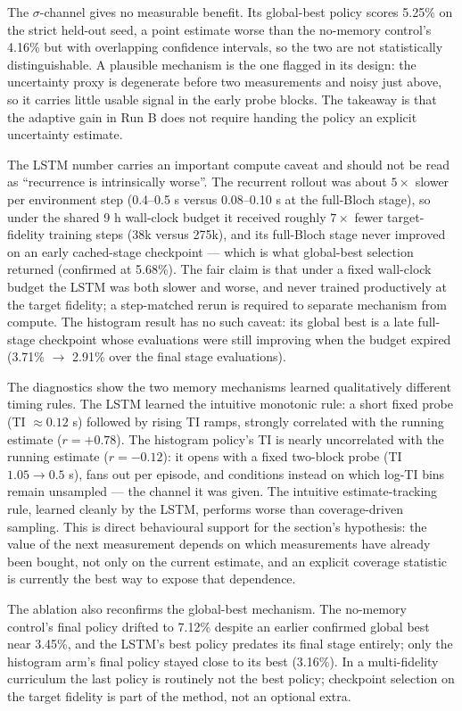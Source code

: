 The $\sigma$-channel gives no measurable benefit. Its global-best policy
scores 5.25\% on the strict held-out seed, a point estimate worse than the
no-memory control's 4.16\% but with overlapping confidence intervals, so the
two are not statistically distinguishable. A plausible mechanism is the one
flagged in its design: the uncertainty proxy is degenerate before two
measurements and noisy just above, so it carries little usable signal in the
early probe blocks. The takeaway is that the adaptive gain in Run B does not
require handing the policy an explicit uncertainty estimate.

The LSTM number carries an important compute caveat and should not be read
as ``recurrence is intrinsically worse''. The recurrent rollout was about
$5\times$ slower per environment step (0.4--0.5 s versus 0.08--0.10 s at
the full-Bloch stage), so under the shared 9 h wall-clock budget it received
roughly $7\times$ fewer target-fidelity training steps (38k versus 275k),
and its full-Bloch stage never improved on an early cached-stage checkpoint
--- which is what global-best selection returned (confirmed at 5.68\%). The
fair claim is that under a fixed wall-clock budget the LSTM was both slower
and worse, and never trained productively at the target fidelity; a
step-matched rerun is required to separate mechanism from compute. The
histogram result has no such caveat: its global best is a late full-stage
checkpoint whose evaluations were still improving when the budget expired
(3.71\% $\to$ 2.91\% over the final stage evaluations).

The diagnostics show the two memory mechanisms learned qualitatively
different timing rules. The LSTM learned the intuitive monotonic rule: a
short fixed probe (TI ${\approx}0.12$ s) followed by rising TI ramps,
strongly correlated with the running estimate ($r=+0.78$). The histogram
policy's TI is nearly uncorrelated with the running estimate ($r=-0.12$):
it opens with a fixed two-block probe (TI $1.05 \to 0.5$ s), fans out per
episode, and conditions instead on which log-TI bins remain unsampled ---
the channel it was given. The intuitive estimate-tracking rule, learned
cleanly by the LSTM, performs worse than coverage-driven sampling. This is
direct behavioural support for the section's hypothesis: the value of the
next measurement depends on which measurements have already been bought,
not only on the current estimate, and an explicit coverage statistic is
currently the best way to expose that dependence.

The ablation also reconfirms the global-best mechanism. The no-memory
control's final policy drifted to 7.12\% despite an
earlier confirmed global best near 3.45\%, and the LSTM's best policy
predates its final stage entirely; only the histogram arm's final policy
stayed close to its best (3.16\%). In a
multi-fidelity curriculum the last policy is routinely not the best policy;
checkpoint selection on the target fidelity is part of the method, not an
optional extra.

